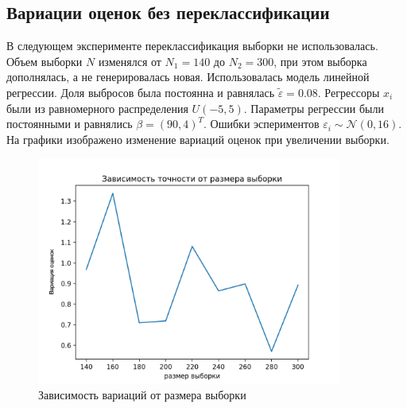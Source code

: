 \newpage
\subsection{Вариации оценок без переклассификации}
В следующем эксперименте переклассификация выборки не использовалась. 
Объем выборки $N$ изменялся от $N_1=140$ до $N_2=300$, при этом выборка дополнялась, а не генерировалась новая. Использовалась модель линейной регрессии. Доля выбросов была постоянна и равнялась $\widetilde{\varepsilon}=0.08$. 
Регрессоры $x_i$ были из равномерного распределения $U(-5,5)$.  Параметры регрессии были постоянными и равнялись $\beta=(90,4)^T$. Ошибки эспериментов $\varepsilon_i\sim \mathcal{N}(0,16)$.
На графики изображено изменение вариаций оценок при увеличении выборки.
\begin{figure}[hb]
    \centering
    \includegraphics[width=100mm]{../images/plot_90_4_accuracy-samplesize.png}
    \caption{Зависимость вариаций от размера выборки\label{overflow}}
    \label{pic6}
\end{figure}



